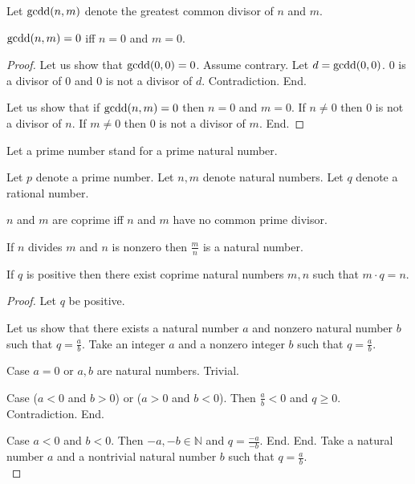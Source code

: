 \documentclass{article}
\begin{document}
\begin{forthel}

Let $\text{gcdd}(n,m)$ denote the greatest common divisor of $n$ and $m$.

\begin{lemma}
$\text{gcdd}(n,m) = 0$ iff $n = 0$ and $m = 0$.
\end{lemma}
\begin{proof}
Let us show that $\text{gcdd}(0,0) = 0$.
  Assume contrary. Let $d = \text{gcdd}(0,0)$. 0 is a divisor of 0 and 0 is not a divisor of $d$. Contradiction. End.

Let us show that if $\text{gcdd}(n,m) = 0$ then $n = 0$ and $m = 0$.
  If $n \neq 0$ then 0 is not a divisor of $n$.
  If $m \neq 0$ then 0 is not a divisor of $m$.
End.
\end{proof}

  Let a prime number stand for a prime natural number.

    Let $p$ denote a prime number.
    Let $n,m$ denote natural numbers.
    Let $q$ denote a rational number.

    \begin{definition}
      $n$ and $m$ are coprime iff $n$ and $m$ have no common prime divisor.
    \end{definition}



\begin{lemma}
If $n$ divides $m$ and $n$ is nonzero then $\frac{m}{n}$ is a natural number.
\end{lemma}



    \begin{lemma}
      If $q$ is positive then there exist coprime natural numbers $m,n$ such that $m \cdot q = n$.
    \end{lemma}
\begin{proof}
Let $q$ be positive. 

Let us show that there exists a natural number $a$ and nonzero natural number $b$ such that $q = \frac{a}{b}$.
  Take an integer $a$ and a nonzero integer $b$ such that $q = \frac{a}{b}$.
  
  Case $a = 0$ or $a,b$ are natural numbers. Trivial.
  
  Case ($a < 0$ and $b > 0$) or ($a > 0$ and $b < 0$). Then $\frac{a}{b} < 0$ and $q \geq 0$. Contradiction. End.
  
  Case $a < 0$ and $b < 0$. Then $-a,-b \in \mathbb{N}$ and $q = \frac{-a}{-b}$. End.
End.
Take a natural number $a$ and a nontrivial natural number $b$ such that $q = \frac{a}{b}$.\\


\end{proof}
\end{forthel}
\end{document}

